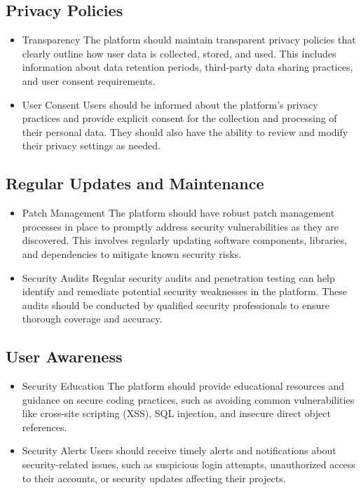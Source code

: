 \subsection{Privacy Policies}

\begin{itemize}
	\item{Transparency}
	The platform should maintain transparent privacy policies that clearly outline how user data is collected, stored, and used. This includes information about data retention periods, third-party data sharing practices, and user consent requirements.
	\item {User Consent}
	Users should be informed about the platform's privacy practices and provide explicit consent for the collection and processing of their personal data. They should also have the ability to review and modify their privacy settings as needed.
\end{itemize}

\subsection{Regular Updates and Maintenance}

\begin{itemize}
	\item {Patch Management}
	The platform should have robust patch management processes in place to promptly address security vulnerabilities as they are discovered. This involves regularly updating software components, libraries, and dependencies to mitigate known security risks.
	\item {Security Audits}
	Regular security audits and penetration testing can help identify and remediate potential security 	weaknesses in the platform. These audits should be conducted by qualified security professionals to ensure thorough coverage and accuracy.
\end{itemize}

\subsection{User Awareness}

\begin{itemize}
	\item {Security Education}
	The platform should provide educational resources and guidance on secure coding practices, such as avoiding common vulnerabilities like cross-site scripting (XSS), SQL injection, and insecure direct object references.
	\item {Security Alerts}
	Users should receive timely alerts and notifications about security-related issues, such as suspicious login attempts, unauthorized access to their accounts, or security updates affecting their projects.
\end{itemize}









